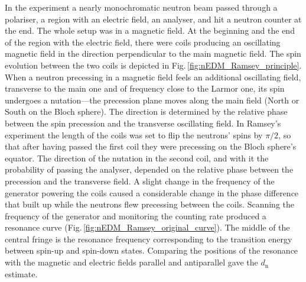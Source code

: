 In the experiment a nearly monochromatic neutron beam passed through a polariser, a region with an electric field, an analyser, and hit a neutron counter at the end. The whole setup was in a magnetic field. At the beginning and the end of the region with the electric field, there were coils producing an oscillating magnetic field in the direction perpendicular to the main magnetic field. The spin evolution between the two coils is depicted in Fig.\,\ref{fig:nEDM_Ramsey_principle}. When a neutron precessing in a magnetic field feels an additional oscillating field, transverse to the main one and of frequency close to the Larmor one, its spin undergoes a nutation---the precession plane moves along the main field (North or South on the Bloch sphere). The direction is determined by the relative phase between the spin precession and the transverse oscillating field. In Ramsey's experiment the length of the coils was set to flip the neutrons' spins by $\pi/2$, so that after having passed the first coil they were precessing on the Bloch sphere's equator. The direction of the nutation in the second coil, and with it the probability of passing the analyser, depended on the relative phase between the precession and the transverse field. A slight change in the frequency of the generator powering the coils caused a considerable change in the phase difference that built up while the neutrons flew precessing between the coils. Scanning the frequency of the generator and monitoring the counting rate produced a resonance curve (Fig.\,\ref{fig:nEDM_Ramsey_original_curve}). The middle of the central fringe is the resonance frequency corresponding to the transition energy between spin-up and spin-down states.
Comparing the positions of the resonance with the magnetic and electric fields parallel and antiparallel gave the $d_\text{n}$ estimate.

